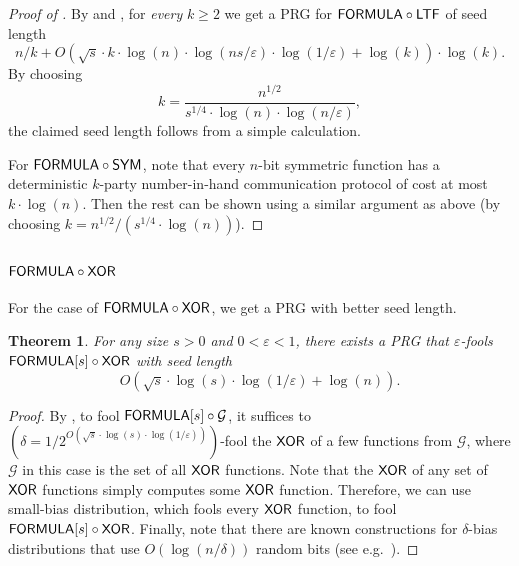\documentclass[10pt,a4paper]{article}
\newtheorem{theorem}{Theorem}
\newcommand{\FORMULA}{{\sf FORMULA}}
\newcommand{\XOR}{{\sf XOR}}
\newcommand{\LTF}{{\sf LTF}}
\newcommand{\SYM}{{\sf SYM}}
\begin{document}
	\begin{proof}[Proof of ]
	    By  and , for \emph{every} $k\geq 2$ we get a PRG for $\FORMULA\circ\LTF$ of seed length
        \[
    		n/k+O\left(\sqrt{s}\cdot k\cdot \log(n) \cdot\log(ns/\varepsilon)\cdot\log(1/\varepsilon)+\log(k)\right)\cdot\log(k).
    	\]
	    By choosing 
	    \[
	        k=\frac{n^{1/2}}{s^{1/4}\cdot\log(n)\cdot\log(n/\varepsilon)},
	    \]
	    the claimed seed length follows from a simple calculation.
	
	    For $\FORMULA\circ\SYM$, note that every $n$-bit symmetric function has a deterministic $k$-party number-in-hand communication protocol of cost at most $k\cdot\log(n)$. Then the rest can be shown using a similar argument as above (by choosing $k=n^{1/2}/\left(s^{1/4}\cdot\log(n)\right)$).
	\end{proof}

%
       
%

%
%
%
%
%
%

    \subsubsection{\texorpdfstring{$\FORMULA\circ\XOR$}{FORMULA-XOR}}
    
    For the case of $\FORMULA\circ\XOR$, we get a PRG with better seed length. 
    
	\begin{theorem}\label{thm:prg-formula-xor}
		For any size $s>0$ and $0<\varepsilon<1$, there exists a PRG that $\varepsilon$-fools $\FORMULA[s]\circ \XOR$ with seed length
		\[
			O\left(\sqrt{s}\cdot\log(s)\cdot\log(1/\varepsilon)+\log(n)\right).
		\]
	\end{theorem}
	
	\begin{proof}
	    By , to fool $\FORMULA[s]\circ\mathcal{G}$, it suffices to $\left(\delta=1/2^{O\left(\sqrt{s}\cdot\log (s)\cdot \log(1/\varepsilon)\right)}\right)$-fool the $\XOR$ of a few functions from $\mathcal{G}$, where $\mathcal{G}$ in this case is the set of all $\XOR$ functions. Note that the $\XOR$ of any set of $\XOR$ functions simply computes some $\XOR$ function. Therefore, we can use small-bias distribution, which fools every $\XOR$ function, to fool $\FORMULA[s]\circ\XOR$. Finally, note that there are known constructions for $\delta$-bias distributions that use $O(\log(n/\delta))$ random bits (see e.g.~\cite{AGHP92}).
	\end{proof}
	
\end{document}
